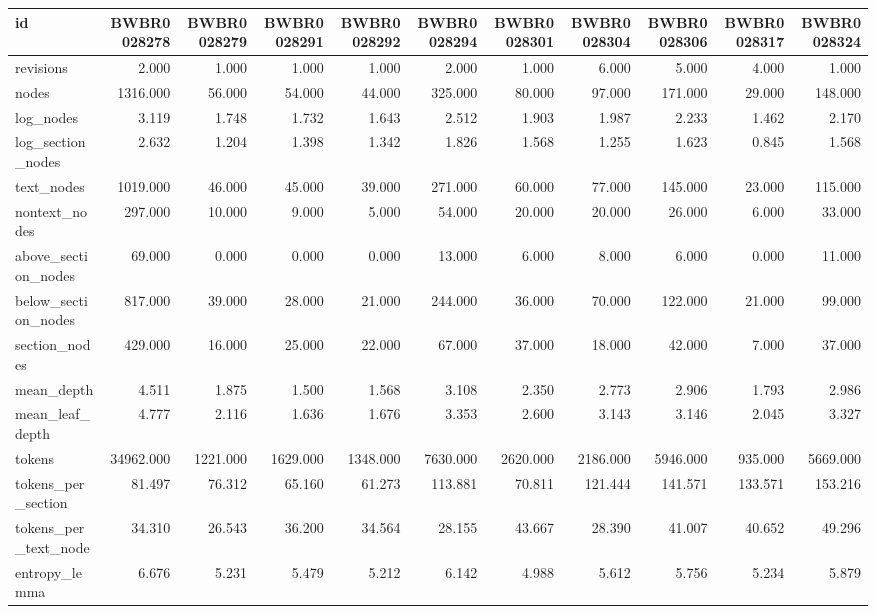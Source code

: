 \begin{tabular}{lrrrrrrrrrr}
\toprule
id & BWBR0028278 & BWBR0028279 & BWBR0028291 & BWBR0028292 & BWBR0028294 & BWBR0028301 & BWBR0028304 & BWBR0028306 & BWBR0028317 & BWBR0028324 \\
\midrule
revisions & 2.000 & 1.000 & 1.000 & 1.000 & 2.000 & 1.000 & 6.000 & 5.000 & 4.000 & 1.000 \\
\cline{1-11}
nodes & 1316.000 & 56.000 & 54.000 & 44.000 & 325.000 & 80.000 & 97.000 & 171.000 & 29.000 & 148.000 \\
\cline{1-11}
log\_nodes & 3.119 & 1.748 & 1.732 & 1.643 & 2.512 & 1.903 & 1.987 & 2.233 & 1.462 & 2.170 \\
\cline{1-11}
log\_section\_nodes & 2.632 & 1.204 & 1.398 & 1.342 & 1.826 & 1.568 & 1.255 & 1.623 & 0.845 & 1.568 \\
\cline{1-11}
text\_nodes & 1019.000 & 46.000 & 45.000 & 39.000 & 271.000 & 60.000 & 77.000 & 145.000 & 23.000 & 115.000 \\
\cline{1-11}
nontext\_nodes & 297.000 & 10.000 & 9.000 & 5.000 & 54.000 & 20.000 & 20.000 & 26.000 & 6.000 & 33.000 \\
\cline{1-11}
above\_section\_nodes & 69.000 & 0.000 & 0.000 & 0.000 & 13.000 & 6.000 & 8.000 & 6.000 & 0.000 & 11.000 \\
\cline{1-11}
below\_section\_nodes & 817.000 & 39.000 & 28.000 & 21.000 & 244.000 & 36.000 & 70.000 & 122.000 & 21.000 & 99.000 \\
\cline{1-11}
section\_nodes & 429.000 & 16.000 & 25.000 & 22.000 & 67.000 & 37.000 & 18.000 & 42.000 & 7.000 & 37.000 \\
\cline{1-11}
mean\_depth & 4.511 & 1.875 & 1.500 & 1.568 & 3.108 & 2.350 & 2.773 & 2.906 & 1.793 & 2.986 \\
\cline{1-11}
mean\_leaf\_depth & 4.777 & 2.116 & 1.636 & 1.676 & 3.353 & 2.600 & 3.143 & 3.146 & 2.045 & 3.327 \\
\cline{1-11}
tokens & 34962.000 & 1221.000 & 1629.000 & 1348.000 & 7630.000 & 2620.000 & 2186.000 & 5946.000 & 935.000 & 5669.000 \\
\cline{1-11}
tokens\_per\_section & 81.497 & 76.312 & 65.160 & 61.273 & 113.881 & 70.811 & 121.444 & 141.571 & 133.571 & 153.216 \\
\cline{1-11}
tokens\_per\_text\_node & 34.310 & 26.543 & 36.200 & 34.564 & 28.155 & 43.667 & 28.390 & 41.007 & 40.652 & 49.296 \\
\cline{1-11}
entropy\_lemma & 6.676 & 5.231 & 5.479 & 5.212 & 6.142 & 4.988 & 5.612 & 5.756 & 5.234 & 5.879 \\

\end{tabular}
